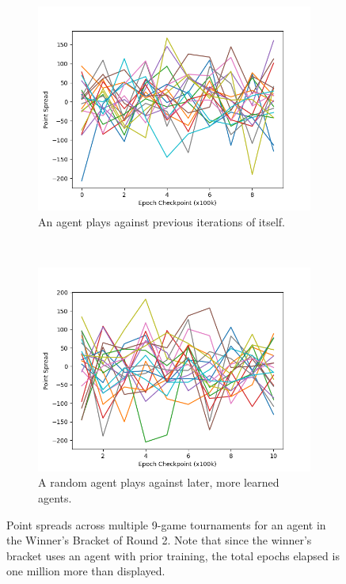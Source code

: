 
\begin{figure}
\center

\begin{subfigure}[b]{0.45\textwidth}
	\includegraphics[width=\linewidth]{images/findings/round2/spreads_self-v-prev_winner.png}
	\caption{An agent plays against previous iterations of itself.}
	\label{fig:r2-spreads-winner-a}
\end{subfigure}
~
\begin{subfigure}[b]{0.45\textwidth}
	\includegraphics[width=\linewidth]{images/findings/round2/spreads_rand-v-fut_winner.png}
	\caption{A random agent plays against later, more learned agents.}
	\label{fig:r2-spreads-winner-b}
\end{subfigure}

\caption{
	Point spreads across multiple 9-game tournaments for an agent in the
	Winner's Bracket of Round 2.
	Note that since the winner's bracket uses an agent with prior training,
	the total epochs elapsed is one million more than displayed.
}
\label{fig:r2-spreads-winner}
\end{figure}
